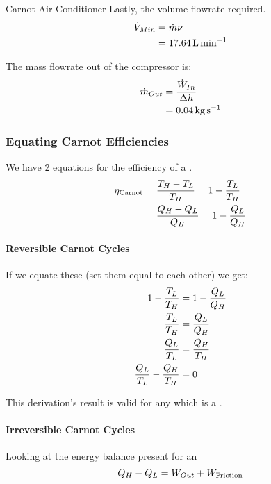 \begin{example}{Carnot Air Conditioner}
  Lastly, the volume flowrate required.
  \begin{align*}
    \dot{V}_{Min} &= \dot{m} \nu \\
                             &= \SI{17.64}{\liter\per\minute}
  \end{align*}

  The mass flowrate out of the compressor is:
  \begin{align*}
    \dot{m}_{Out} &= \frac{\dot{W}_{In}}{\Delta h} \\
                           &= \SI{0.04}{\kilo\gram\per\second}
  \end{align*}
\end{example}

\subsubsection{Equating Carnot Efficiencies}\label{subsubsec:Equating_Carnot_Efficiencies}
We have 2 equations for the efficiency of a .
\begin{align*}
  \eta_{\text{Carnot}} &= \frac{T_{H} - T_{L}}{T_{H}} = 1 - \frac{T_{L}}{T_{H}} \\
                              &= \frac{Q_{H} - Q_{L}}{Q_{H}} = 1 - \frac{Q_{L}}{Q_{H}}
\end{align*}

\paragraph{Reversible Carnot Cycles}\label{par:Reversible_Carnot_Cycles}
If we equate these (set them equal to each other) we get:
\begin{align*}
  1 - \frac{T_{L}}{T_{H}} &= 1 - \frac{Q_{L}}{Q_{H}} \\
  \frac{T_{L}}{T_{H}} &= \frac{Q_{L}}{Q_{H}} \\
  \frac{Q_{L}}{T_{L}} &= \frac{Q_{H}}{T_{H}} \\
  \frac{Q_{L}}{T_{L}} - \frac{Q_{H}}{T_{H}} &= 0
\end{align*}

This derivation's result is valid for any  which is a .

\paragraph{Irreversible Carnot Cycles}\label{par:Irreversible_Carnot_Cycles}
Looking at the energy balance present for an 
\begin{equation*}
  Q_{H} - Q_{L} = W_{Out} + W_{\text{Friction}}
\end{equation*}

